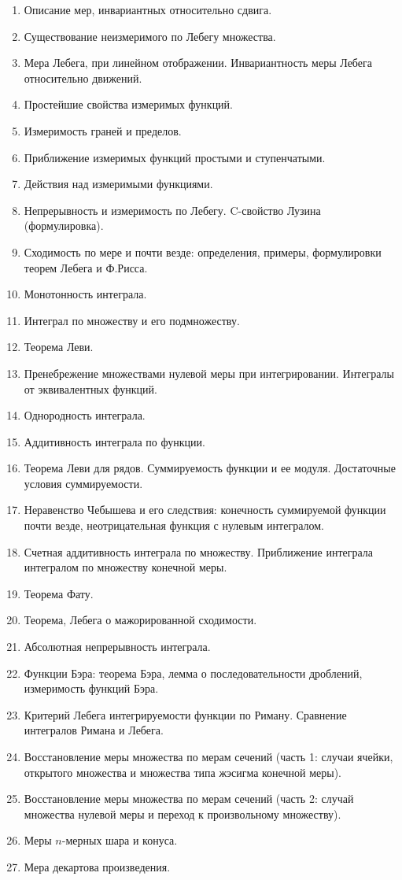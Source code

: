 \documentclass[12pt, a4paper, oneside]{memoir}
\begin{document}
\begin{enumerate}
\item Описание мер, инвариантных относительно сдвига.
\item Существование неизмеримого по Лебегу множества.
\item Мера Лебега, при линейном отображении. Инвариантность меры Лебега относительно движений.
\item Простейшие свойства измеримых функций.
\item Измеримость граней и пределов.
\item Приближение измеримых функций простыми и ступенчатыми.
\item Действия над измеримыми функциями.
\item Непрерывность и измеримость по Лебегу. C-свойство Лузина (формулировка).
\item Сходимость по мере и почти везде: определения, примеры, формулировки теорем Лебега и Ф.Рисса.
\item Монотонность интеграла.
\item Интеграл по множеству и его подмножеству.
\item Теорема Леви.
\item Пренебрежение множествами нулевой меры при интегрировании. Интегралы от эквивалентных функций.
\item Однородность интеграла.
\item Аддитивность интеграла по функции.
\item Теорема Леви для рядов. Суммируемость функции и ее модуля. Достаточные условия суммируемости.
\item Неравенство Чебышева и его следствия: конечность суммируемой функции почти везде, неотрицательная функция с нулевым интегралом.
\item Счетная аддитивность интеграла по множеству. Приближение интеграла интегралом по множеству конечной меры.
\item Теорема Фату.
\item Теорема, Лебега о мажорированной сходимости.
\item Абсолютная непрерывность интеграла.
\item Функции Бэра: теорема Бэра, лемма о последовательности дроблений, измеримость функций Бэра.
\item Критерий Лебега интегрируемости функции по Риману. Сравнение интегралов Римана и Лебега.
\item Восстановление меры множества по мерам сечений (часть 1: случаи ячейки, открытого множества и множества типа жэсигма конечной меры).
\item Восстановление меры множества по мерам сечений (часть 2: случай множества нулевой меры и переход к произвольному множеству).
\item Меры $n$-мерных шара и конуса.
\item Мера декартова произведения.
\end{enumerate}
\end{document}
